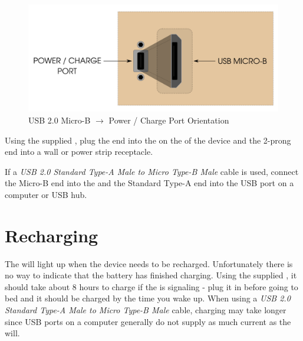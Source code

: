 \begin{figure}[H]
\centering
  \includegraphics{images/usb_orientation.png}
\caption{USB 2.0 Micro-B $\longrightarrow$ Power / Charge Port Orientation}
\end{figure}

Using the supplied , plug the  end into the  on the
 of the device and the 2-prong end into a wall or power strip receptacle.

\par\medskip

If a \textit{USB 2.0 Standard Type-A Male to Micro Type-B Male} cable is used,
connect the Micro-B end into the  and the Standard Type-A end into the
USB port on a computer or USB hub.

\section{Recharging} \label{Recharging}

The \hyperref[Low Battery Indicator]{} will light up when the device
needs to be recharged.  Unfortunately there is no way to indicate that the
battery has finished charging. Using the supplied
\hyperref[Power Adapter]{}, it should take about \num{8} hours to charge
if the  is signaling - plug it in before going to bed and it should be
charged by the time you wake up.  When using a \textit{USB 2.0 Standard Type-A
Male to Micro Type-B Male} cable, charging may take longer since USB ports on a
computer generally do not supply as much current as the  will.


